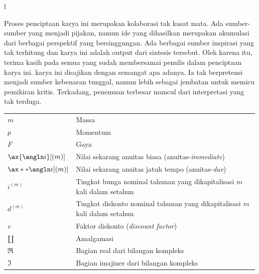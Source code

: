 \documentclass{SkripsiUnesa}
\begin{document}


\Awal
\HalamanJudul
\SampulDalam

\begin{Abstrak}
	
\lipsum[1-2]
l\end{Abstrak}
\newpage

\begin{Abstract}
	
\lipsum[1-2]
\end{Abstract}

\SuratPernyataan
\HalamanPersetujuan %
\HalamanPengesahan %

\Prakata

Proses penciptaan karya ini merupakan kolaborasi tak kasat mata. Ada sumber-sumber yang menjadi pijakan, namun ide yang dihasilkan merupakan akumulasi dari berbagai perspektif yang bersinggungan. Ada berbagai sumber inspirasi yang tak terhitung dan karya ini adalah output dari sintesis tersebut. Oleh karena itu, terima kasih pada semua yang sudah membersamai penulis dalam penciptaan karya ini. karya ini disajikan dengan semangat apa adanya. Ia tak berpretensi menjadi sumber kebenaran tunggal, namun lebih sebagai jembatan untuk memicu pemikiran kritis. Terkadang, penemuan terbesar muncul dari interpretasi yang tak terduga.

\DaftarIsi
\DaftarTabel
\DaftarGambar
\DaftarSimbol
\renewcommand{\arraystretch}{1.2}
\begin{tabular}{p{} p{}}
	$m$ & Massa\\
	$p$ & Momentum\\
	$F$ & Gaya\\
	$\ax{\angln i}[\left(m\right)]$ & Nilai sekarang anuitas biasa (anuitas-\textit{immediate})\\
	$\ax**{\angln i}[\left(m\right)]$ & Nilai sekarang anuitas jatuh tempo (anuitas-\textit{due})\\
	$i^{(m)}$ & Tingkat bunga nominal tahunan yang dikapitalisasi $m$ kali dalam setahun\\
	$d^{(m)}$ & Tingkat diskonto nominal tahunan yang dikapitalisasi $m$ kali dalam setahun\\
	$v$ & Faktor diskonto (\textit{discount factor})\\
	$\amalg$ & Amalgamasi\\
	$\Re$ & Bagian real dari bilangan kompleks\\
	$\Im$ & Bagian imajiner dari bilangan kompleks 
\end{tabular}
\newpage
\end{document}
